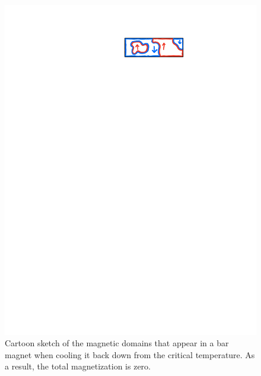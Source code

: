 \begin{figure}[htbp]
    \centering
    \includegraphics[]{Images/fig-magnetdomains.pdf}

    \caption{Cartoon sketch of the magnetic domains that appear in a bar magnet when cooling it back down from the critical temperature. As a result, the total magnetization is zero.}
    \label{fig-magnetdomains.pdf}
\end{figure}

